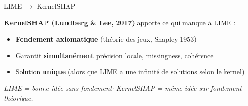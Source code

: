\documentclass[10pt]{beamer}
\begin{document}
\begin{frame}{LIME $\to$ KernelSHAP}
  \begin{plusbox}
    \textbf{KernelSHAP (Lundberg \& Lee, 2017)} apporte ce qui manque à LIME :
    \begin{itemize}
      \item \textbf{Fondement axiomatique} (théorie des jeux, Shapley 1953)
      \item Garantit \textbf{simultanément} précision locale, missingness, cohérence
      \item Solution \textbf{unique} (alors que LIME a une infinité de solutions selon le kernel)
    \end{itemize}
    \vspace{2pt}
    \centering
    \emph{LIME = bonne idée sans fondement; KernelSHAP = même idée sur fondement théorique.}
  \end{plusbox}
\end{frame}
\end{document}
